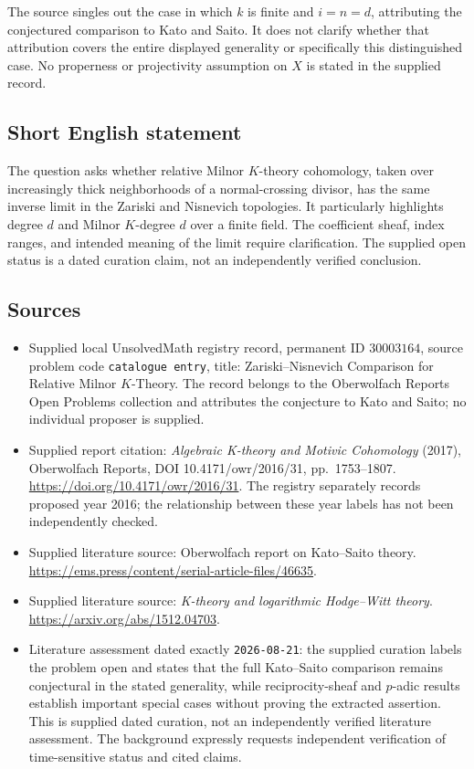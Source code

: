 \documentclass[11pt]{article}
\begin{document}
The source singles out the case in which \(k\) is finite and \(i=n=d\), attributing the conjectured comparison to Kato and Saito. It does not clarify whether that attribution covers the entire displayed generality or specifically this distinguished case. No properness or projectivity assumption on \(X\) is stated in the supplied record.
\subsection{Short English statement}
The question asks whether relative Milnor \(K\)-theory cohomology, taken over increasingly thick neighborhoods of a normal-crossing divisor, has the same inverse limit in the Zariski and Nisnevich topologies. It particularly highlights degree \(d\) and Milnor \(K\)-degree \(d\) over a finite field. The coefficient sheaf, index ranges, and intended meaning of the limit require clarification. The supplied open status is a dated curation claim, not an independently verified conclusion.
\subsection{Sources}
\begin{itemize}
\item Supplied local UnsolvedMath registry record, permanent ID \(30003164\), source problem code \texttt{catalogue entry}, title: Zariski--Nisnevich Comparison for Relative Milnor \(K\)-Theory. The record belongs to the Oberwolfach Reports Open Problems collection and attributes the conjecture to Kato and Saito; no individual proposer is supplied.
\item Supplied report citation: \emph{Algebraic K-theory and Motivic Cohomology} (2017), Oberwolfach Reports, DOI 10.4171/owr/2016/31, pp.\ 1753--1807. \url{https://doi.org/10.4171/owr/2016/31}. The registry separately records proposed year 2016; the relationship between these year labels has not been independently checked.
\item Supplied literature source: Oberwolfach report on Kato--Saito theory. \url{https://ems.press/content/serial-article-files/46635}.
\item Supplied literature source: \emph{K-theory and logarithmic Hodge--Witt theory}. \url{https://arxiv.org/abs/1512.04703}.
\item Literature assessment dated exactly \texttt{2026-08-21}: the supplied curation labels the problem open and states that the full Kato--Saito comparison remains conjectural in the stated generality, while reciprocity-sheaf and \(p\)-adic results establish important special cases without proving the extracted assertion. This is supplied dated curation, not an independently verified literature assessment. The background expressly requests independent verification of time-sensitive status and cited claims.
\end{itemize}
\end{document}
